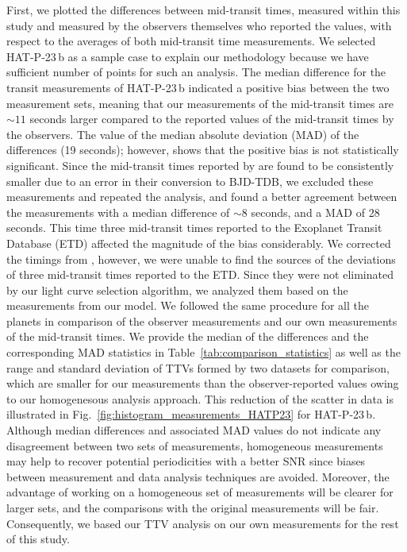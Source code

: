 \documentclass[a4paper,fleqn,usenatbib]{mnras}
\begin{document}
First, we plotted the differences between mid-transit times, measured within this study and measured by the observers themselves who reported the values, with respect to the averages of both mid-transit time measurements. We selected HAT-P-23\,b as a sample case to explain our methodology because we have sufficient number of points for such an analysis.  The median difference for the transit measurements of HAT-P-23\,b indicated a positive bias between the two measurement sets, meaning that our measurements of the mid-transit times are $\sim11$ seconds larger compared to the reported values of the mid-transit times by the observers. The value of the median absolute deviation (MAD) of the differences (19 seconds); however, shows that the positive bias is not statistically significant. Since the mid-transit times reported by \citet{2015A&A...577A..54C} are found to be consistently smaller due to an error in their conversion to BJD-TDB, we excluded these measurements and repeated the analysis, and found a better agreement between the measurements with a median difference of $\sim8$ seconds, and a MAD of 28 seconds. This time three mid-transit times reported to the Exoplanet Transit Database (ETD) affected the magnitude of the bias considerably. We corrected the timings from \citet{2015A&A...577A..54C}, however, we were unable to find the sources of the deviations of three mid-transit times reported to the ETD. Since they were not eliminated by our light curve selection algorithm, we analyzed them based on the measurements from our model. We followed the same procedure for all the planets in comparison of the observer measurements and our own measurements of the mid-transit times. We provide the median of the differences and the corresponding MAD statistics in Table~\ref{tab:comparison_statistics} as well as the range and standard deviation of TTVs formed by two datasets for comparison, which are smaller for our measurements than the observer-reported values owing to our homogenesous analysis approach. This reduction of the scatter in data is illustrated in Fig.~\ref{fig:histogram_measurements_HATP23} for HAT-P-23\,b. Although median differences and associated MAD values do not indicate any disagreement between two sets of measurements, homogeneous measurements may help to recover potential periodicities with a better SNR since biases between measurement and data analysis techniques are avoided. Moreover, the advantage of working on a homogeneous set of measurements will be clearer for larger sets, and the comparisons with the original measurements will be fair. Consequently, we based our TTV analysis on our own measurements for the rest of this study.   
\end{document}
